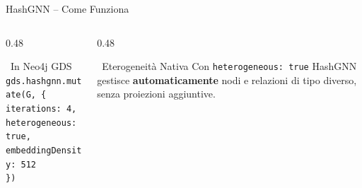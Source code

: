 \documentclass[aspectratio=169]{beamer}
\newcommand{\icoNet}{\faNetworkWired}
\newcommand{\icoCode}{\faCode}
\newcommand{\icoNet}{\ding{213}}
\newcommand{\icoCode}{\texttt{</>}}
\begin{document}
\begin{frame}{HashGNN -- Come Funziona}
  \vspace{0.4cm}
  \begin{columns}[T]
    \begin{column}{0.48\textwidth}
      \begin{block}{\icoCode\ In Neo4j GDS}
        \footnotesize
        \texttt{gds.hashgnn.mutate(G, \{}\\
        \texttt{\hspace{1.5em}iterations: 4,}\\
        \texttt{\hspace{1.5em}heterogeneous: true,}\\
        \texttt{\hspace{1.5em}embeddingDensity: 512}\\
        \texttt{\})}
      \end{block}
    \end{column}
    \begin{column}{0.48\textwidth}
      \begin{block}{\icoNet\ Eterogeneità Nativa}
        \footnotesize
        Con \texttt{heterogeneous: true} HashGNN gestisce
        \textbf{automaticamente} nodi e relazioni di tipo diverso,
        senza proiezioni aggiuntive.
      \end{block}
    \end{column}
  \end{columns}
\end{frame}
\end{document}
